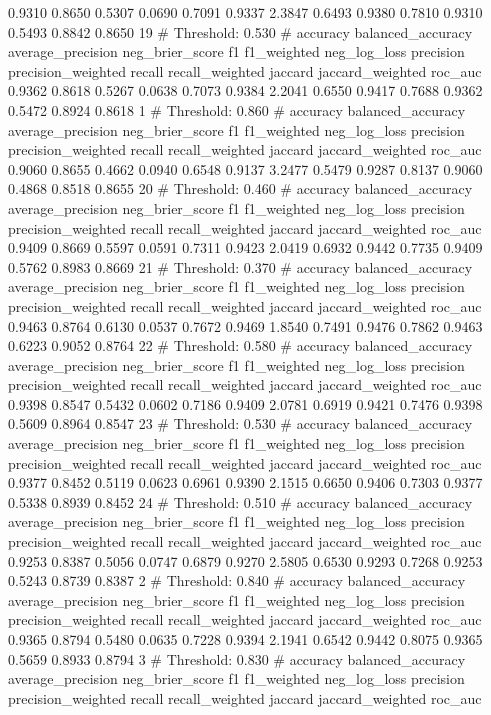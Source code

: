 0.9310
0.8650
0.5307
0.0690
0.7091
0.9337
2.3847
0.6493
0.9380
0.7810
0.9310
0.5493
0.8842
0.8650
19
# Threshold: 0.530
# accuracy  balanced_accuracy  average_precision  neg_brier_score  f1  f1_weighted  neg_log_loss  precision  precision_weighted  recall  recall_weighted  jaccard  jaccard_weighted  roc_auc
0.9362
0.8618
0.5267
0.0638
0.7073
0.9384
2.2041
0.6550
0.9417
0.7688
0.9362
0.5472
0.8924
0.8618
1
# Threshold: 0.860
# accuracy  balanced_accuracy  average_precision  neg_brier_score  f1  f1_weighted  neg_log_loss  precision  precision_weighted  recall  recall_weighted  jaccard  jaccard_weighted  roc_auc
0.9060
0.8655
0.4662
0.0940
0.6548
0.9137
3.2477
0.5479
0.9287
0.8137
0.9060
0.4868
0.8518
0.8655
20
# Threshold: 0.460
# accuracy  balanced_accuracy  average_precision  neg_brier_score  f1  f1_weighted  neg_log_loss  precision  precision_weighted  recall  recall_weighted  jaccard  jaccard_weighted  roc_auc
0.9409
0.8669
0.5597
0.0591
0.7311
0.9423
2.0419
0.6932
0.9442
0.7735
0.9409
0.5762
0.8983
0.8669
21
# Threshold: 0.370
# accuracy  balanced_accuracy  average_precision  neg_brier_score  f1  f1_weighted  neg_log_loss  precision  precision_weighted  recall  recall_weighted  jaccard  jaccard_weighted  roc_auc
0.9463
0.8764
0.6130
0.0537
0.7672
0.9469
1.8540
0.7491
0.9476
0.7862
0.9463
0.6223
0.9052
0.8764
22
# Threshold: 0.580
# accuracy  balanced_accuracy  average_precision  neg_brier_score  f1  f1_weighted  neg_log_loss  precision  precision_weighted  recall  recall_weighted  jaccard  jaccard_weighted  roc_auc
0.9398
0.8547
0.5432
0.0602
0.7186
0.9409
2.0781
0.6919
0.9421
0.7476
0.9398
0.5609
0.8964
0.8547
23
# Threshold: 0.530
# accuracy  balanced_accuracy  average_precision  neg_brier_score  f1  f1_weighted  neg_log_loss  precision  precision_weighted  recall  recall_weighted  jaccard  jaccard_weighted  roc_auc
0.9377
0.8452
0.5119
0.0623
0.6961
0.9390
2.1515
0.6650
0.9406
0.7303
0.9377
0.5338
0.8939
0.8452
24
# Threshold: 0.510
# accuracy  balanced_accuracy  average_precision  neg_brier_score  f1  f1_weighted  neg_log_loss  precision  precision_weighted  recall  recall_weighted  jaccard  jaccard_weighted  roc_auc
0.9253
0.8387
0.5056
0.0747
0.6879
0.9270
2.5805
0.6530
0.9293
0.7268
0.9253
0.5243
0.8739
0.8387
2
# Threshold: 0.840
# accuracy  balanced_accuracy  average_precision  neg_brier_score  f1  f1_weighted  neg_log_loss  precision  precision_weighted  recall  recall_weighted  jaccard  jaccard_weighted  roc_auc
0.9365
0.8794
0.5480
0.0635
0.7228
0.9394
2.1941
0.6542
0.9442
0.8075
0.9365
0.5659
0.8933
0.8794
3
# Threshold: 0.830
# accuracy  balanced_accuracy  average_precision  neg_brier_score  f1  f1_weighted  neg_log_loss  precision  precision_weighted  recall  recall_weighted  jaccard  jaccard_weighted  roc_auc
